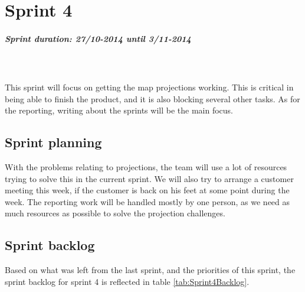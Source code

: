 \documentclass[11pt,a4paper,titlepage,oneside]{report}
\begin{document}
\chapter{Sprint 4}
\paragraph{Sprint duration: 27/10-2014 until 3/11-2014} \hfill \\
\\
\noindent
This sprint will focus on getting the map projections working. This is critical in being able to finish the product, and it is also blocking several other tasks. As for the reporting, writing about the sprints will be the main focus. 

\section{Sprint planning}
With the problems relating to projections, the team will use a lot of resources trying to solve this in the current sprint. We will also try to arrange a customer meeting this week, if the customer is back on his feet at some point during the week. The reporting work will be handled mostly by one person, as we need as much resources as possible to solve the projection challenges. 
\section{Sprint backlog}
Based on what was left from the last sprint, and the priorities of this sprint, the sprint backlog for sprint 4 is reflected in table \ref{tab:Sprint4Backlog}.
\end{document}
